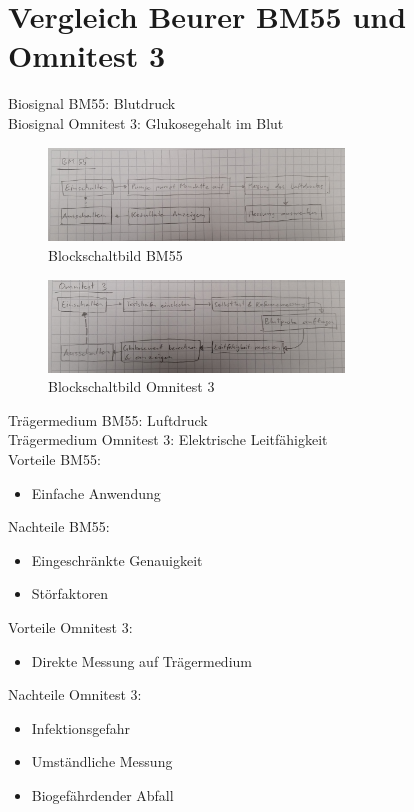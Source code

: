 \section{Vergleich Beurer BM55 und Omnitest 3}
Biosignal BM55: Blutdruck \\
Biosignal Omnitest 3: Glukosegehalt im Blut \\
\begin{figure}[h!]
    \centering
    \includegraphics[width=0.7\textwidth]{Ablauf_BM55.jpg}
    \caption{Blockschaltbild BM55}
\end{figure}
\begin{figure}[h!]
    \centering
    \includegraphics[width=0.7\textwidth]{Ablauf_Omnitest_3.jpg}
    \caption{Blockschaltbild Omnitest 3}
\end{figure}
Trägermedium BM55: Luftdruck \\
Trägermedium Omnitest 3: Elektrische Leitfähigkeit \\
Vorteile BM55: 
\begin{itemize}
    \item Einfache Anwendung
\end{itemize}
Nachteile BM55: 
\begin{itemize}
    \item Eingeschränkte Genauigkeit
    \item Störfaktoren
\end{itemize}
Vorteile Omnitest 3: 
\begin{itemize}
    \item Direkte Messung auf Trägermedium
\end{itemize}
Nachteile Omnitest 3: 
\begin{itemize}
    \item Infektionsgefahr
    \item Umständliche Messung
    \item Biogefährdender Abfall
\end{itemize}
